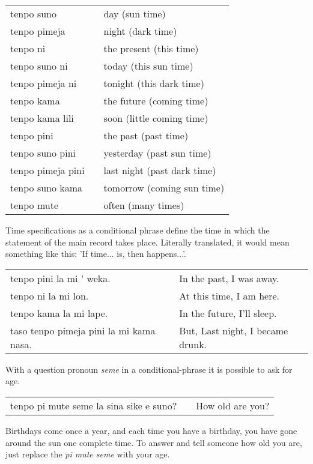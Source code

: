 \begin{supertabular}{p{5,5cm}|ll}
tenpo suno && day (sun time) \\
tenpo pimeja && night (dark time) \\
tenpo ni && the present (this time) \\
tenpo suno ni && today (this sun time) \\
tenpo pimeja ni && tonight (this dark time) \\
tenpo kama && the future (coming time) \\
tenpo kama lili && soon (little coming time) \\
tenpo pini && the past (past time) \\
tenpo suno pini && yesterday (past sun time) \\
tenpo pimeja pini && last night (past dark time) \\
tenpo suno kama && tomorrow (coming sun time) \\
tenpo mute && often (many times) \\
\end{supertabular} 

Time specifications as a conditional phrase define the time in which the statement of the main record takes place. 
Literally translated, it would mean something like this: 'If time... is, then happens...'. 

\begin{supertabular}{p{5,5cm}|ll}
tenpo pini la mi ' weka. && In the past, I was away. \\
tenpo ni la mi lon. && At this time, I am here. \\
tenpo kama la mi lape. && In the future, I'll sleep. \\
taso tenpo pimeja pini la mi kama nasa. && But, Last night, I became drunk. \\
\end{supertabular} 

With a question pronoun \textit{seme} in a conditional-phrase it is possible to ask for age.

\begin{supertabular}{p{5,5cm}|ll}
tenpo pi mute seme la sina sike e suno? && How old are you? \\
\end{supertabular} 

Birthdays come once a year, and each time you have a birthday, you have gone around the sun one complete time. 
To answer and tell someone how old you are, just replace the \textit{pi mute seme} with your age.

